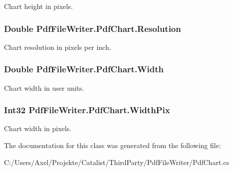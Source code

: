 Chart height in pixels. 

\subsubsection[{\texorpdfstring{Resolution}{Resolution}}]{\setlength{\rightskip}{0pt plus 5cm}Double Pdf\+File\+Writer.\+Pdf\+Chart.\+Resolution\hspace{0.3cm}{\ttfamily [get]}}\hypertarget{class_pdf_file_writer_1_1_pdf_chart_aa948dfd08bf85fb6d1e5d1376d18d922}{}\label{class_pdf_file_writer_1_1_pdf_chart_aa948dfd08bf85fb6d1e5d1376d18d922}


Chart resolution in pixels per inch. 

\subsubsection[{\texorpdfstring{Width}{Width}}]{\setlength{\rightskip}{0pt plus 5cm}Double Pdf\+File\+Writer.\+Pdf\+Chart.\+Width\hspace{0.3cm}{\ttfamily [get]}}\hypertarget{class_pdf_file_writer_1_1_pdf_chart_a2bbac5f243d2593a15a68c17283765de}{}\label{class_pdf_file_writer_1_1_pdf_chart_a2bbac5f243d2593a15a68c17283765de}


Chart width in user units. 

\subsubsection[{\texorpdfstring{Width\+Pix}{WidthPix}}]{\setlength{\rightskip}{0pt plus 5cm}Int32 Pdf\+File\+Writer.\+Pdf\+Chart.\+Width\+Pix\hspace{0.3cm}{\ttfamily [get]}}\hypertarget{class_pdf_file_writer_1_1_pdf_chart_ace6927c84e4d0a2fee7b5afd9536bec4}{}\label{class_pdf_file_writer_1_1_pdf_chart_ace6927c84e4d0a2fee7b5afd9536bec4}


Chart width in pixels. 



The documentation for this class was generated from the following file\+:\begin{DoxyCompactItemize}
\item 
C\+:/\+Users/\+Axel/\+Projekte/\+Catalist/\+Third\+Party/\+Pdf\+File\+Writer/Pdf\+Chart.\+cs\end{DoxyCompactItemize}
